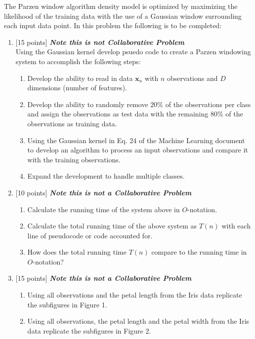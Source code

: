 \documentclass{article}
\begin{document}
\begin{enumerate}
The Parzen window algorithm density model is optimized by maximizing the likelihood of the training data with the use of a Gaussian window surrounding each input data point. In this problem the following is to be completed:\\
		\begin{enumerate}
			\item {[15 points]} \textbf{\emph{Note this is not Collaborative Problem}}\\
			Using the Gaussian kernel develop psuedo code to create a Parzen windowing system to accomplish the following steps:
				\begin{enumerate}
					\item Develop the ability to read in data $\textbf{x}_n$ with $n$ observations and $D$ dimensions (number of features).
					\item Develop the ability to randomly remove $20\%$ of the observations per class and assign the observations as test data with the remaining $80\%$ of the observations as training data.  
					\item Using the Gaussian kernel in Eq. 24 of the Machine Learning document to develop an algorithm to process an input observations and compare it with the training observations.
					\item Expand the development to handle multiple classes.
				\end{enumerate}
			\item {[10 points]} \textbf{\emph{Note this is not a Collaborative Problem}}
				\begin{enumerate}
					\item Calculate the running time of the system above in $O$-notation.
					\item Calculate the total running time of the above system as $T(n)$ with each line of pseudocode or code accounted for.
					\item How does the total running time $T(n)$ compare to the running time in $O$-notation?
				\end{enumerate}
			\item {[15 points]} \textbf{\emph{Note this is not a Collaborative Problem}}
				\begin{enumerate}
					\item Using all observations and the petal length from the Iris data replicate the subfigures in Figure 1.  
					\item Using all observations, the petal length and the petal width from the Iris data replicate the subfigures in Figure 2.  
				\end{enumerate}
		\end{enumerate}


\end{enumerate}
\end{document}
